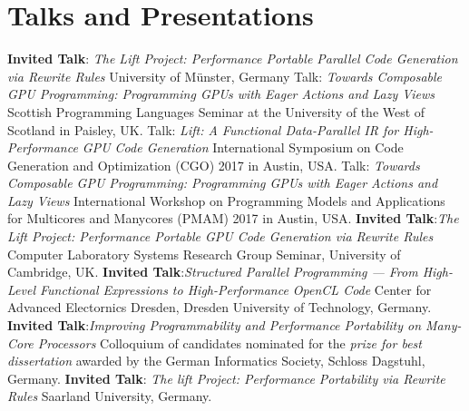 \documentclass[11pt,a4paper]{moderncv}
\begin{document}
\section{Talks and Presentations}
         {\textbf{Invited Talk}:\newline
          \emph{The Lift Project: Performance Portable Parallel Code Generation via Rewrite Rules}\newline
         \small University of Münster, Germany}
         {Talk: \emph{Towards Composable GPU Programming: Programming GPUs with Eager Actions and Lazy Views}\newline
         \small Scottish Programming Languages Seminar at the University of the West of Scotland in Paisley, UK.}
         {Talk: \emph{Lift: A Functional Data-Parallel IR for High-Performance GPU Code Generation}\newline
          \small International Symposium on Code Generation and Optimization (CGO) 2017 in Austin, USA.}
         {Talk: \emph{Towards Composable GPU Programming: Programming GPUs with Eager Actions and Lazy Views}\newline
          \small  International Workshop on Programming Models and Applications for Multicores and Manycores (PMAM) 2017 in Austin, USA.}
         {\textbf{Invited Talk}:\newline \emph{The Lift Project: Performance Portable GPU Code Generation via Rewrite Rules}\newline
         Computer Laboratory Systems Research Group Seminar, University of Cambridge, UK.
         }
         {\textbf{Invited Talk}:\newline \emph{Structured Parallel Programming --- From High-Level Functional Expressions to High-Performance OpenCL Code}\newline
         Center for Advanced Electornics Dresden, Dresden University of Technology, Germany.
         }
         {\textbf{Invited Talk}:\newline \emph{Improving Programmability and Performance Portability on Many-Core Processors}\newline
         \small Colloquium of candidates nominated for the \emph{prize for best dissertation} awarded by the German Informatics Society, Schloss Dagstuhl, Germany.}
         {\textbf{Invited Talk}: \emph{The lift Project: Performance Portability via Rewrite Rules}\newline
          \small Saarland University, Germany.}
\end{document}
